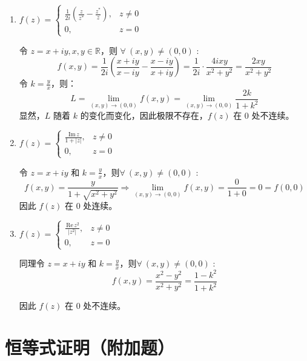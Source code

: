 \documentclass[UTF8]{report}
\def\Im{\mathrm{\,Im\,}}
\def\Re{\mathrm{\,Re\,}}
\def\R{\mathbb{R}}
\theoremstyle{MyLineTheoremStyle} %
\theoremstyle{MyBlockTheoremStyle} %
\theoremstyle{MySubsubsectionStyle} %
\begin{document}
\begin{enumerate}
\item $f(z) = \begin{cases}
    \frac{1}{2i}(\frac{z}{z^*} - \frac{z^*}{z}), & z \neq 0 \\ 
    0, & z = 0
\end{cases}$

令 $z = x + iy, x,y \in \R$，则 $\forall\ (x,y) \ne (0,0)$ :
\begin{equation*}
f(x,y) 
= \frac{1}{2i} \left(\frac{x+iy}{x-iy} - \frac{x-iy}{x+iy}\right) 
= \frac{1}{2i} \cdot \frac{ 4ixy }{x^2 + y^2} = \frac{2xy}{x^2 + y^2} 
\end{equation*}
令 $k = \frac{y}{x}$，则：
\begin{equation*}
L = \lim_{(x,y) \to (0,0)} f(x,y) 
= \lim_{(x,y) \to (0,0)} \frac{2k}{1+k^2}
\end{equation*}
显然，$L$ 随着 $k$ 的变化而变化，因此极限不存在，$f(z)$ 在 $0$ 处不连续。

\item $f(z) = \begin{cases}
    \frac{\Im z}{1 + | z |}, & z \neq 0 \\ 
    0, & z = 0
\end{cases}$

令 $z = x + iy$ 和 $k = \frac{y}{x}$，则$\forall\ (x,y) \ne (0,0)$ :
\begin{equation*}
    f(x,y) = \frac{y}{1+\sqrt{x^2+y^2}} \Longrightarrow \lim_{(x,y) \to (0,0)} f(x,y) = \frac{0}{1+0} = 0 = f(0,0) 
\end{equation*}
因此 $f(z)$ 在 0 处连续。

\item  $f(z) = \begin{cases}
    \frac{\Re z^2}{| z^2 |}, & z \neq 0 \\ 
    0, & z = 0
\end{cases}$

同理令 $z = x + iy$ 和 $k = \frac{y}{x}$，则$\forall\ (x,y) \ne (0,0)$ :
\begin{equation*}
f(x,y) = \frac{x^2 - y^2}{ x^2 + y^2 } = \frac{1-k^2}{1+k^2} 
\end{equation*}

因此 $f(z)$ 在 0 处不连续。

\end{enumerate}



\section{恒等式证明（附加题）}
\end{document}

